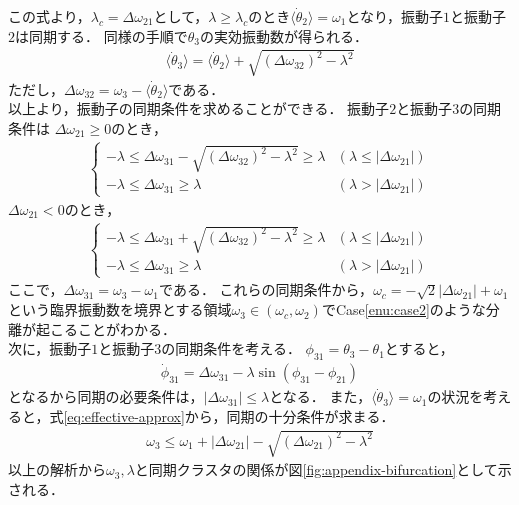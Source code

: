 \documentclass[../main]{subfiles}
\begin{document}
この式より，$\lambda_c=\Delta\omega_{21}$として，$\lambda\geq\lambda_c$のとき$\langle\dot{\theta}_2\rangle=\omega_1$となり，振動子$1$と振動子$2$は同期する．
同様の手順で$\theta_3$の実効振動数が得られる．
\begin{align}
    \label{eq:effective-approx}
    \langle\dot{\theta}_3\rangle=\langle\dot{\theta}_2\rangle+\sqrt{(\Delta\omega_{32})^2-\lambda^2}
\end{align}
ただし，$\Delta\omega_{32}=\omega_3-\langle\dot{\theta}_2\rangle$である．\\
以上より，振動子の同期条件を求めることができる．
振動子$2$と振動子$3$の同期条件は
$\Delta\omega_{21}\geq 0$のとき，
\begin{align*}
    \begin{cases}
        -\lambda\leq\Delta\omega_{31}-\sqrt{(\Delta\omega_{32})^2-\lambda^2}\geq\lambda & (\lambda\leq|\Delta\omega_{21}|)\\
        -\lambda\leq\Delta\omega_{31}\geq\lambda & (\lambda>|\Delta\omega_{21}|)
    \end{cases}
\end{align*}
$\Delta\omega_{21}< 0$のとき，
\begin{align*}
    \begin{cases}
        -\lambda\leq\Delta\omega_{31}+\sqrt{(\Delta\omega_{32})^2-\lambda^2}\geq\lambda & (\lambda\leq|\Delta\omega_{21}|)\\
        -\lambda\leq\Delta\omega_{31}\geq\lambda & (\lambda>|\Delta\omega_{21}|)
    \end{cases}
\end{align*}
ここで，$\Delta\omega_{31}=\omega_3-\omega_1$である．
これらの同期条件から，$\omega_c=-\sqrt{2}|\Delta\omega_21|+\omega_1$という臨界振動数を境界とする領域$\omega_3\in(\omega_c,\omega_2)$でCase\ref{enu:case2}のような分離が起こることがわかる．\\
次に，振動子$1$と振動子$3$の同期条件を考える．
$\phi_{31}=\theta_3-\theta_1$とすると，
\begin{align*}
    \dot{\phi}_{31}=\Delta\omega_{31}-\lambda\sin(\phi_{31}-\phi_{21})
\end{align*}
となるから同期の必要条件は，$|\Delta\omega_{31}|\leq \lambda$となる．
また，$\langle\dot{\theta}_3\rangle=\omega_1$の状況を考えると，式\eqref{eq:effective-approx}から，同期の十分条件が求まる．
\begin{align*}
    \omega_3\leq\omega_1+|\Delta\omega_{21}|-\sqrt{(\Delta\omega_{21})^2-\lambda^2}
\end{align*}
以上の解析から$\omega_3,\lambda$と同期クラスタの関係が図\ref{fig:appendix-bifurcation}として示される．
\end{document}
